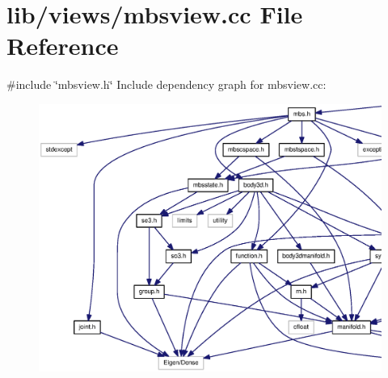 \section{lib/views/mbsview.cc \-File \-Reference}
\label{mbsview_8cc}
{\ttfamily \#include \char`\"{}mbsview.\-h\char`\"{}}\*
\-Include dependency graph for mbsview.\-cc\-:
\nopagebreak
\begin{figure}[H]
\begin{center}
\leavevmode
\includegraphics[width=350pt]{mbsview_8cc__incl}
\end{center}
\end{figure}
